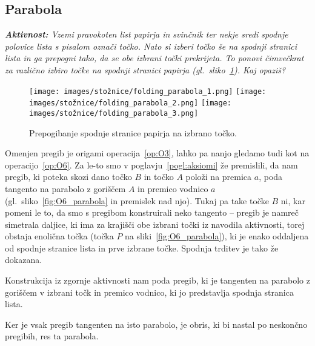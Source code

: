 \subsection{Parabola}

\textit{\textbf{Aktivnost:} Vzemi pravokoten list papirja in svinčnik ter nekje sredi spodnje polovice lista s pisalom označi točko. Nato si izberi točko še na spodnji stranici lista in ga prepogni tako, da se obe izbrani točki prekrijeta. To ponovi čimvečkrat za različno izbiro točke na spodnji stranici papirja (gl.\ sliko~\ref{fig:koraki_parabola}). Kaj opaziš?}

\begin{figure}[h]
    \centering
    \texttt{[image: images/stožnice/folding\_parabola\_1.png]}
    \texttt{[image: images/stožnice/folding\_parabola\_2.png]}
    \texttt{[image: images/stožnice/folding\_parabola\_3.png]}
    \caption[Prepogibanje parabole]{Prepogibanje spodnje stranice papirja na izbrano točko.}
    \label{fig:koraki_parabola}
\end{figure}


Omenjen pregib je origami operacija~\ref{op:O3}, lahko pa nanjo gledamo tudi kot na operacijo~\ref{op:O6}. Za le-to smo v poglavju~\ref{pogl:aksiomi} že premislili, da nam pregib, ki poteka skozi dano točko $B$ in točko $A$ položi na premica $a$, poda tangento na parabolo z goriščem $A$ in premico vodnico $a$ (gl.\ sliko~\ref{fig:O6_parabola} in premislek nad njo). Tukaj pa take točke $B$ ni, kar pomeni le to, da smo s pregibom konstruirali neko tangento -- pregib je namreč simetrala daljice, ki ima za krajišči obe izbrani točki iz navodila aktivnosti, torej obstaja enolična točka (točka $P$ na sliki~\ref{fig:O6_parabola}), ki je enako oddaljena od spodnje stranice lista in prve izbrane točke. Spodnja trditev je tako že dokazana.

\begin{trditev}
    Konstrukcija iz zgornje aktivnosti nam poda pregib, ki je tangenten na parabolo z goriščem v izbrani točk in premico vodnico, ki jo predstavlja spodnja stranica lista.
\end{trditev}

Ker je vsak pregib tangenten na isto parabolo, je obris, ki bi nastal po neskončno pregibih, res ta parabola.

